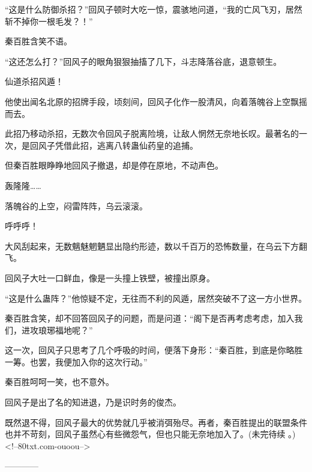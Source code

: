 \begin{this_body}
“这是什么防御杀招？”回风子顿时大吃一惊，震骇地问道，“我的亡风飞刃，居然斩不掉你一根毛发？！”

秦百胜含笑不语。

“这还怎么打？”回风子的眼角狠狠抽搐了几下，斗志降落谷底，退意顿生。

仙道杀招风遁！

他使出闻名北原的招牌手段，顷刻间，回风子化作一股清风，向着落魄谷上空飘摇而去。

此招乃移动杀招，无数次令回风子脱离险境，让敌人惘然无奈地长叹。最著名的一次，是回风子凭借此招，逃离八转蛊仙药皇的追捕。

但秦百胜眼睁睁地回风子撤退，却是停在原地，不动声色。

轰隆隆……

落魄谷的上空，闷雷阵阵，乌云滚滚。

呼呼呼！

大风刮起来，无数魑魅魍魉显出隐约形迹，数以千百万的恐怖数量，在乌云下方翻飞。

回风子大吐一口鲜血，像是一头撞上铁壁，被撞出原身。

“这是什么蛊阵？”他惊疑不定，无往而不利的风遁，居然突破不了这一方小世界。

秦百胜含笑，却不回答回风子的问题，而是问道：“阁下是否再考虑考虑，加入我们，进攻琅琊福地呢？”

这一次，回风子只思考了几个呼吸的时间，便落下身形：“秦百胜，到底是你略胜一筹。也罢，我便加入你的这次行动。”

秦百胜呵呵一笑，也不意外。

回风子是出了名的知进退，乃是识时务的俊杰。

既然退不得，回风子最大的优势就几乎被消弭殆尽。再者，秦百胜提出的联盟条件也并不苛刻，回风子虽然心有些微怨气，但也只能无奈地加入了。(未完待续 。)<!--80txt.com-ouoou-->

------------

\end{this_body}

